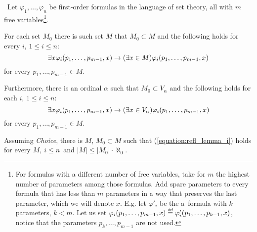 \begin{lemma}\label{lemma:reflection_lemma}\
Let $\varphi_1, \ldots, \varphi_n$ be first-order formulas in the language of set theory, all with $m$ free variables\footnote{For formulas with a different number of free variables, take for $m$ the highest number of parameters among those formulas. Add spare parameters to every formula that has less than $m$ parameters in a way that preserves the last parameter, which we will denote $x$. E.g. let $\varphi'_i$ be the a~formula with $k$ parameters, $k < m$. Let us set $\varphi_i(p_1, \ldots, p_{m-1}, x) \defeq \varphi'_i(p_1, \ldots, p_{k-1}, x)$, notice that the parameters $p_k, \ldots, p_{m-1}$ are not used.}.
\bce[(i)]
\item For each set $M_0$ there is such set $M$ that $M_0 \subset M$ and the following holds for every $i$, $1 \leq i \leq n$:
\begin{equation}\label{equation:refl_lemma_i}
\exists x \varphi_i(p_1, \ldots, p_{m-1}, x) \rightarrow (\exists x \in M) \varphi_i(p_1, \ldots, p_{m-1}, x)
\end{equation}
for every $p_1, \ldots, p_{m-1} \in M$.

\item Furthermore, there is an ordinal $\alpha$ such that $M_0 \subset V_\alpha$ and the following holds for each $i$, $1 \leq i \leq n$:
\begin{equation}\label{equation:refl_lemma_ii}
\exists x \varphi_i(p_1, \ldots, p_{m-1}, x) \rightarrow (\exists x \in V_\alpha) \varphi_i(p_1, \ldots, p_{m-1}, x)
\end{equation}
for every $p_1, \ldots, p_{m-1} \in M$.

\item Assuming \emph{Choice}, there is $M$, $M_0 \subset M$ such that (\ref{equation:refl_lemma_i}) holds for every $M,\ i \leq n$ and $|M| \leq |M_0| \cdot \aleph_0$.
\ece
\end{lemma}

